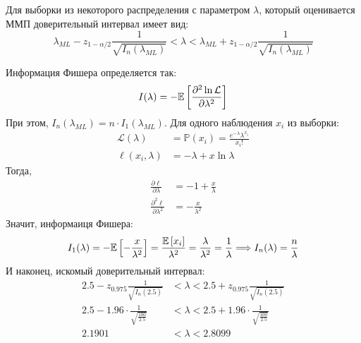 \documentclass{article}
\begin{document}
Для выборки из некоторого распределения с параметром $\lambda$, который оценивается ММП доверительный интервал имеет вид:
\begin{equation*}
    \lambda_{M L}-z_{1-\alpha / 2} \frac{1}{\sqrt{I_n\left(\lambda_{M L}\right)}} < \lambda < \lambda_{M L}+z_{1-\alpha / 2} \frac{1}{\sqrt{I_n\left(\lambda_{M L}\right)}}
\end{equation*}

Информация Фишера определяется так:
\begin{equation*}
    I(\lambda)=-\mathbb{E}\left[\frac{\partial^2\ln\mathcal{L}}{\partial\lambda^2}\right]
\end{equation*}
При этом, $I_n\left(\lambda_{M L}\right)=n\cdot I_1(\lambda_{ML})$. Для одного наблюдения $x_i$ из выборки:
\begin{equation*}
    \begin{aligned}
        \mathcal{L}(\lambda)&=\mathbb{P}(x_i)=\frac{e^{-\lambda}\lambda^{x_i}}{x_i!}\\
        \ell(x_i,\lambda)&=-\lambda + x \ln \lambda
    \end{aligned}
\end{equation*}
Тогда,
\begin{equation*}
    \begin{aligned}
        \frac{\partial\ell}{\partial\lambda}&=-1 + \frac{x}{\lambda}\\
        \frac{\partial^2\ell}{\partial\lambda^2}&=-\frac{x}{\lambda^2}
    \end{aligned}
\end{equation*}
Значит, информаиця Фишера:
\begin{equation*}
    I_1(\lambda)=-\mathbb{E}\left[-\frac{x}{\lambda^2}\right]=\frac{\mathbb{E}\left[x_i\right]}{\lambda^2}=\frac{\lambda}{\lambda^2}=\frac{1}{\lambda}\Longrightarrow I_n(\lambda)=\frac{n}{\lambda}
\end{equation*}
И наконец, искомый доверительный интервал:
\begin{equation*}
    \begin{aligned}
        2.5-z_{0.975} \frac{1}{\sqrt{I_n\left(2.5\right)}}&< \lambda < 2.5+z_{0.975} \frac{1}{\sqrt{I_n\left(2.5\right)}}\\
        2.5-1.96\cdot\frac{1}{\sqrt{\frac{100}{2.5}}}&< \lambda < 2.5+1.96\cdot\frac{1}{\sqrt{\frac{100}{2.5}}}\\
        2.1901&< \lambda < 2.8099
    \end{aligned}
\end{equation*}
\end{document}
